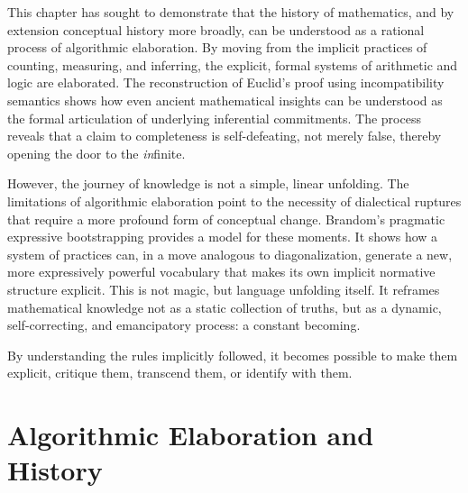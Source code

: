 \documentclass[12pt]{book}
\begin{document}
This chapter has sought to demonstrate that the history of mathematics, and by extension conceptual history more broadly, can be understood as a rational process of algorithmic elaboration. By moving from the implicit practices of counting, measuring, and inferring, the explicit, formal systems of arithmetic and logic are elaborated. The reconstruction of Euclid's proof using incompatibility semantics shows how even ancient mathematical insights can be understood as the formal articulation of underlying inferential commitments. The process reveals that a claim to completeness is self-defeating, not merely false, thereby opening the door to the \textit{in}finite.

However, the journey of knowledge is not a simple, linear unfolding. The limitations of algorithmic elaboration point to the necessity of dialectical ruptures that require a more profound form of conceptual change. Brandom's pragmatic expressive bootstrapping provides a model for these moments. It shows how a system of practices can, in a move analogous to diagonalization, generate a new, more expressively powerful vocabulary that makes its own implicit normative structure explicit. This is not magic, but language unfolding itself. It reframes mathematical knowledge not as a static collection of truths, but as a dynamic, self-correcting, and emancipatory process: a constant becoming. 


By understanding the rules implicitly followed, it becomes possible to make them explicit, critique them, transcend them, or identify with them. 

\printbibliography[heading=subbibliography]

\chapter{Algorithmic Elaboration and History}
\end{document}
